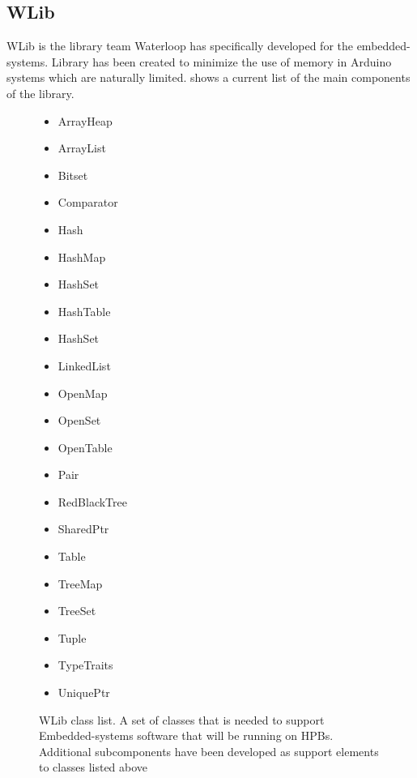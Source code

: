 \documentclass[main.tex]{subfiles}
\begin{document}
   \subsection{WLib}
   WLib is the library team Waterloop has specifically developed for the embedded-systems. Library has been created  to minimize the use of memory in Arduino systems which are naturally limited.  shows a current list of the main components of the library.
   \begin{figure}
   \begin{multicols}{4}
        \begin{itemize}
            \item ArrayHeap
            \item ArrayList
            \item Bitset
            \item Comparator
            \item Hash
            \item HashMap
            \item HashSet
            \item HashTable
            \item HashSet
            \item LinkedList
            \item OpenMap
            \item OpenSet
            \item OpenTable
            \item Pair
            \item RedBlackTree
            \item SharedPtr
            \item Table
            \item TreeMap
            \item TreeSet
            \item Tuple
            \item TypeTraits
            \item UniquePtr
        \end{itemize}
        \end{multicols}
        \caption{WLib class list. A set of classes that is needed to support Embedded-systems software that will be running on HPBs. Additional subcomponents have been developed as support elements to classes listed above}
        \label{list:wlib-classes}
    \end{figure}
   
\end{document}
